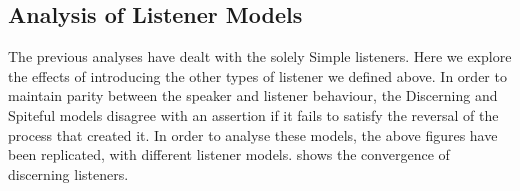 \subsection{Analysis of Listener Models}

The previous analyses have dealt with the solely Simple listeners. Here we explore the effects of introducing the other types of listener we defined above. In order to maintain parity between the speaker and listener behaviour, the Discerning and Spiteful models disagree with an assertion if it fails to satisfy the reversal of the process that created it. In order to analyse these models, the above figures have been replicated, with different listener models.  shows the convergence of discerning listeners. 


